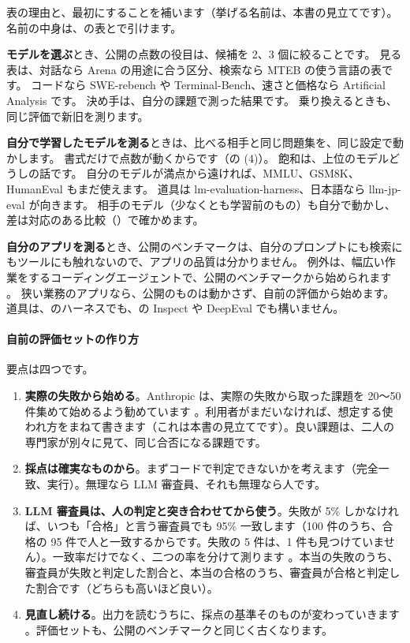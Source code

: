 表の理由と、最初にすることを補います（挙げる名前は、本書の見立てです）。
名前の中身は、の表とで引けます。

\textbf{モデルを選ぶ}とき、公開の点数の役目は、候補を 2、3 個に絞ることです。
見る表は、対話なら Arena の用途に合う区分、検索なら MTEB の使う言語の表です。
コードなら SWE-rebench や Terminal-Bench、速さと価格なら Artificial Analysis です。
決め手は、自分の課題で測った結果です。
乗り換えるときも、同じ評価で新旧を測ります。

\textbf{自分で学習したモデルを測る}ときは、比べる相手と同じ問題集を、同じ設定で動かします。
書式だけで点数が動くからです（の (4)）。
飽和は、上位のモデルどうしの話です。
自分のモデルが満点から遠ければ、MMLU、GSM8K、HumanEval もまだ使えます。
道具は lm-evaluation-harness、日本語なら llm-jp-eval が向きます。
相手のモデル（少なくとも学習前のもの）も自分で動かし、差は対応のある比較（）で確かめます。

\textbf{自分のアプリを測る}とき、公開のベンチマークは、自分のプロンプトにも検索にもツールにも触れないので、アプリの品質は分かりません。
例外は、幅広い作業をするコーディングエージェントで、公開のベンチマークから始められます \cite{husain2026evalsfaq}。
狭い業務のアプリなら、公開のものは動かさず、自前の評価から始めます。
道具は、のハーネスでも、の Inspect や DeepEval でも構いません。

\paragraph{自前の評価セットの作り方}
要点は四つです。
\begin{enumerate}[leftmargin=*,nosep]
  \item \textbf{実際の失敗から始める}。Anthropic は、実際の失敗から取った課題を 20〜50 件集めて始めるよう勧めています \cite{anthropic2026evals}。利用者がまだいなければ、想定する使われ方をまねて書きます（これは本書の見立てです）。良い課題は、二人の専門家が別々に見て、同じ合否になる課題です。
  \item \textbf{採点は確実なものから}。まずコードで判定できないかを考えます（完全一致、実行）。無理なら LLM 審査員、それも無理なら人です。
  \item \textbf{LLM 審査員は、人の判定と突き合わせてから使う}。失敗が 5\% しかなければ、いつも「合格」と言う審査員でも 95\% 一致します（100 件のうち、合格の 95 件で人と一致するからです。失敗の 5 件は、1 件も見つけていません）。一致率だけでなく、二つの率を分けて測ります \cite{husain2026evalsfaq}。本当の失敗のうち、審査員が失敗と判定した割合と、本当の合格のうち、審査員が合格と判定した割合です（どちらも高いほど良い）。
  \item \textbf{見直し続ける}。出力を読むうちに、採点の基準そのものが変わっていきます \cite{shankar2024validators}。評価セットも、公開のベンチマークと同じく古くなります。
\end{enumerate}

